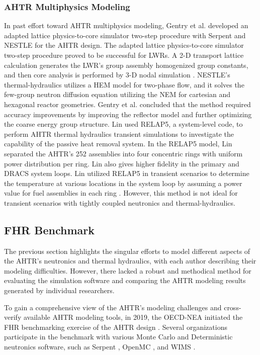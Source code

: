\subsubsection{AHTR Multiphysics Modeling}
In past effort toward \gls{AHTR} multiphysics modeling, Gentry et al. 
\cite{gentry_development_2016} developed an adapted lattice physics-to-core 
simulator two-step procedure with Serpent \cite{leppanen_serpent_2014} 
and \gls{NESTLE} \cite{turinsky_nestle_1994} for the \gls{AHTR} design. 
The adapted lattice physics-to-core simulator two-step procedure proved to be 
successful for \glspl{LWR}. A 2-D transport lattice calculation generates the 
\gls{LWR}'s group assembly homogenized group constants, and then core 
analysis is performed by 3-D nodal simulation 
\cite{koebke_new_1980,gentry_development_2016}.
\gls{NESTLE}'s thermal-hydraulics utilizes a \gls{HEM} model for two-phase 
flow, and it solves the few-group neutron diffusion equation utilizing the
\gls{NEM} for cartesian and hexagonal reactor geometries.  
Gentry et al. concluded that the method required accuracy improvements 
by improving the reflector model and further optimizing the coarse energy group 
structure.
Lin \cite{lin_thermal_2020} used RELAP5, a system-level code, to perform 
\gls{AHTR} thermal hydraulics transient simulations to investigate the 
capability of the passive heat removal system. 
In the RELAP5 model, Lin separated the \gls{AHTR}'s 252 assemblies into 
four concentric rings with uniform power distribution per ring. 
Lin also gives higher fidelity in the primary and \gls{DRACS} system loops. 
Lin utilized RELAP5 in transient scenarios to determine 
the temperature at various locations in the system loop by assuming a power 
value for fuel assemblies in each ring \cite{lin_thermal_2020}. 
However, this method is not ideal for transient scenarios with tightly coupled 
neutronics and thermal-hydraulics. 

\subsection{FHR Benchmark}
The previous section highlights the singular efforts to model 
different aspects of the \gls{AHTR}'s neutronics and thermal hydraulics, with
each author describing their modeling difficulties. 
However, there lacked a robust and methodical method for evaluating the 
simulation software and comparing the \gls{AHTR} modeling results generated by 
individual researchers.

To gain a comprehensive view of the \gls{AHTR}'s modeling challenges and 
cross-verify available \gls{AHTR} modeling tools, in 2019, the 
\gls{OECD}-\gls{NEA} initiated the \gls{FHR} benchmarking exercise 
of the \gls{AHTR} design \cite{noauthor_fluoride_nodate}.
Several organizations participate in the benchmark with various Monte Carlo
and Deterministic neutronics software, such as Serpent \cite{leppanen_serpent_2014}, 
OpenMC \cite{romano_openmc_2013}, and WIMS \cite{lindley_current_2017}. 


